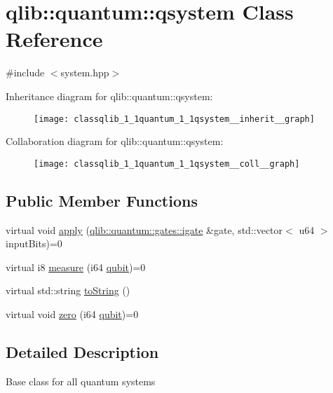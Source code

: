 \hypertarget{classqlib_1_1quantum_1_1qsystem}{}\section{qlib\+:\+:quantum\+:\+:qsystem Class Reference}
\label{classqlib_1_1quantum_1_1qsystem}


{\ttfamily \#include $<$system.\+hpp$>$}



Inheritance diagram for qlib\+:\+:quantum\+:\+:qsystem\+:\nopagebreak
\begin{figure}[H]
\begin{center}
\leavevmode
\texttt{[image: classqlib\_1\_1quantum\_1\_1qsystem\_\_inherit\_\_graph]}
\end{center}
\end{figure}


Collaboration diagram for qlib\+:\+:quantum\+:\+:qsystem\+:\nopagebreak
\begin{figure}[H]
\begin{center}
\leavevmode
\texttt{[image: classqlib\_1\_1quantum\_1\_1qsystem\_\_coll\_\_graph]}
\end{center}
\end{figure}
\subsection*{Public Member Functions}
\begin{DoxyCompactItemize}
\item 
virtual void \hyperlink{classqlib_1_1quantum_1_1qsystem_adbb748feb351aac69ca4a0bf6c92d77c}{apply} (\hyperlink{classqlib_1_1quantum_1_1gates_1_1igate}{qlib\+::quantum\+::gates\+::igate} \&gate, std\+::vector$<$ u64 $>$ input\+Bits)=0
\item 
virtual i8 \hyperlink{classqlib_1_1quantum_1_1qsystem_a33d9954c6ca01cb400d940ff05614364}{measure} (i64 \hyperlink{classqlib_1_1quantum_1_1qubit}{qubit})=0
\item 
virtual std\+::string \hyperlink{classqlib_1_1quantum_1_1qsystem_a9d95030955e2fdb26bc9152c32310e7e}{to\+String} ()
\item 
virtual void \hyperlink{classqlib_1_1quantum_1_1qsystem_a5626857e5dc87dc2bdbb1f4d0b0401f9}{zero} (i64 \hyperlink{classqlib_1_1quantum_1_1qubit}{qubit})=0
\end{DoxyCompactItemize}


\subsection{Detailed Description}
Base class for all quantum systems 

